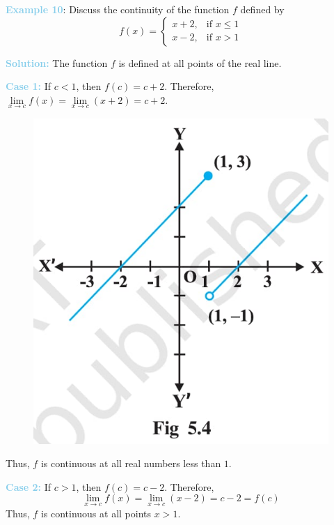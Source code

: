 \documentclass[a4paper,12pt]{article}
\begin{document}
    \noindent \textbf{\textcolor{skyblue}{Example 10}}: Discuss the continuity of the function $f$ defined by
    \[
    f(x) =
    \begin{cases} 
    x+2, & \text{if } x \leq 1 \\ 
    x-2, & \text{if } x > 1 
    \end{cases}
    \]

    \noindent \textbf{\textcolor{skyblue}{Solution:}} The function $f$ is defined at all points of the real line.

    \vspace{8pt}
    \noindent \textbf{\textcolor{skyblue}{Case 1:}} If $c < 1$, then $f(c) = c + 2$. Therefore, $\lim\limits_{x \to c} f(x) = \lim\limits_{x \to c} (x + 2) = c + 2$.

    \begin{figure}
    \centering
    \includegraphics[width=1\linewidth]{a.jpg}
    \end{figure}
    \noindent Thus, $f$ is continuous at all real numbers less than $1$.
     
    \vspace{4pt}
    \noindent\textbf{\textcolor{skyblue}{Case 2:}} If $c > 1$, then $f(c) = c - 2$. Therefore,
    \[
    \lim\limits_{x \to c} f(x) = \lim\limits_{x \to c} (x - 2) = c - 2 = f(c)
    \]
    Thus, $f$ is continuous at all points $x > 1$.
    \vspace{4pt}
    
\end{document}
